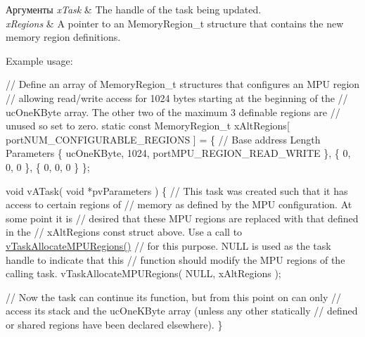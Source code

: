 \begin{DoxyParams}{Аргументы}
{\em x\+Task} & The handle of the task being updated.\\
\hline
{\em x\+Regions} & A pointer to an Memory\+Region\+\_\+t structure that contains the new memory region definitions.\\
\hline
\end{DoxyParams}
Example usage\+: 
\begin{DoxyPre}
// Define an array of MemoryRegion\_t structures that configures an MPU region
// allowing read/write access for 1024 bytes starting at the beginning of the
// ucOneKByte array.  The other two of the maximum 3 definable regions are
// unused so set to zero.
static const MemoryRegion\_t xAltRegions[ portNUM\_CONFIGURABLE\_REGIONS ] =
\{
    // Base address     Length      Parameters
    \{ ucOneKByte,       1024,       portMPU\_REGION\_READ\_WRITE \},
    \{ 0,                0,          0 \},
    \{ 0,                0,          0 \}
\};\end{DoxyPre}



\begin{DoxyPre}void vATask( void *pvParameters )
\{
    // This task was created such that it has access to certain regions of
    // memory as defined by the MPU configuration.  At some point it is
    // desired that these MPU regions are replaced with that defined in the
    // xAltRegions const struct above.  Use a call to \mbox{\hyperlink{task_8h_ad889595baff9faf9efe02f3696825409}{vTaskAllocateMPURegions()}}
    // for this purpose.  NULL is used as the task handle to indicate that this
    // function should modify the MPU regions of the calling task.
    vTaskAllocateMPURegions( NULL, xAltRegions );\end{DoxyPre}



\begin{DoxyPre}    // Now the task can continue its function, but from this point on can only
    // access its stack and the ucOneKByte array (unless any other statically
    // defined or shared regions have been declared elsewhere).
\}
   \end{DoxyPre}
 